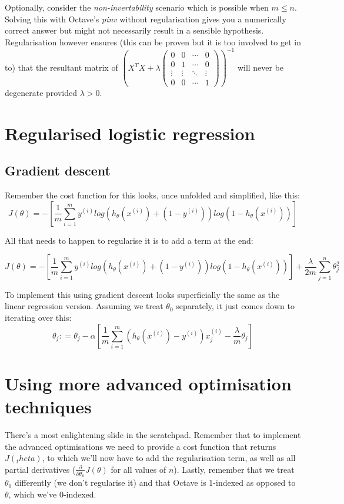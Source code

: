 Optionally, consider the \emph{non-invertability} scenario which is possible when $m \leq n$. Solving this with Octave's \emph{pinv} without regularisation gives you a numerically correct answer but might not necessarily result in a sensible hypothesis. Regularisation however ensures (this can be proven but it is too involved to get in to) that the resultant matrix of $(X^TX + \lambda
\begin{pmatrix}
0 & 0 & \cdots & 0 \\
0 & 1 & \cdots & 0 \\ 
\vdots & \vdots & \ddots & \vdots \\
0 & 0 & \cdots & 1
\end{pmatrix}
)^{-1}$ will never be degenerate provided $\lambda > 0$.

\section{Regularised logistic regression}
\subsection{Gradient descent}
Remember the cost function for this looks, once unfolded and simplified, like this:
\[
	J(\theta) = -[\frac{1}{m}\sum^m_{i = 1}
	y^{(i)}log(h_\theta(x^{(i)}) + (1-y^{(i)}))log(1-h_\theta(x^{(i)}))]
\]

All that needs to happen to regularise it is to add a term at the end:

\[
J(\theta) = -[\frac{1}{m}\sum^m_{i = 1}
y^{(i)}log(h_\theta(x^{(i)}) + (1-y^{(i)}))log(1-h_\theta(x^{(i)}))] + \frac{\lambda}{2m}\sum^n_{j = 1}\theta^2_j
\]

To implement this using gradient descent looks superficially the same as the linear regression version. Assuming we treat $\theta_0$ separately, it just comes down to iterating over this:
\[
\theta_j \mathrel{\mathop:}=
\theta_j - \alpha [\frac{1}{m}
\sum_{i=1}^{m}
(h_\theta(x^{(i)}) - y^{(i)})x_j^{(i)} - \frac{\lambda}{m}\theta_j]
\]

\section{Using more advanced optimisation techniques}
There's a most enlightening slide in the scratchpad. Remember that to implement the advanced optimisations we need to provide a cost function that returns $J(_theta)$, to which we'll now have to add the regularisation term, as well as all partial derivatives ($\frac{\partial}{\partial\theta_n}J(\theta)$ for all values of $n$). Lastly, remember that we treat $\theta_0$ differently (we don't regularise it) and that Octave is 1-indexed as opposed to $\theta$, which we've 0-indexed.